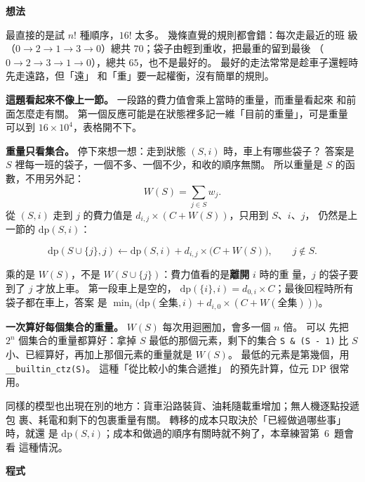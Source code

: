 \textbf{想法}

最直接的是試 $n!$ 種順序，$16!$ 太多。 幾條直覺的規則都會錯：每次走最近的班
級（$0 \to 2 \to 1 \to 3 \to 0$）總共 $70$；袋子由輕到重收，把最重的留到最後
（$0 \to 2 \to 3 \to 1 \to 0$），總共 $65$，也不是最好的。 最好的走法常常是趁車子還輕時先走遠路，但「遠」
和「重」要一起權衡，沒有簡單的規則。

\textbf{這題看起來不像上一節。} 一段路的費力值會乘上當時的重量，而重量看起來
和前面怎麼走有關。 第一個反應可能是在狀態裡多記一維「目前的重量」，可是重量
可以到 $16 \times 10^4$，表格開不下。

\textbf{重量只看集合。} 停下來想一想：走到狀態 $(S, i)$ 時，車上有哪些袋子？
答案是 $S$ 裡每一班的袋子，一個不多、一個不少，和收的順序無關。 所以重量是
$S$ 的函數，不用另外記：
\[
W(S) = \sum_{j \in S} w_j .
\]
從 $(S, i)$ 走到 $j$ 的費力值是 $d_{i,j} \times (C + W(S))$，只用到 $S$、$i$、$j$，
仍然是上一節的 $\mathrm{dp}(S, i)$：

\begin{center}
\end{center}

\[
\mathrm{dp}(S \cup \{j\}, j) \leftarrow \mathrm{dp}(S, i) + d_{i,j} \times \bigl(C + W(S)\bigr), \qquad j \notin S.
\]

乘的是 $W(S)$，不是 $W(S \cup \{j\})$：費力值看的是\textbf{離開} $i$ 時的重
量，$j$ 的袋子要到了 $j$ 才放上車。 第一段車上是空的，
$\mathrm{dp}(\{i\}, i) = d_{0,i} \times C$；最後回程時所有袋子都在車上，答案
是 $\min_i \bigl(\mathrm{dp}(\text{全集}, i) + d_{i,0} \times (C + W(\text{全集}))\bigr)$。

\textbf{一次算好每個集合的重量。} $W(S)$ 每次用迴圈加，會多一個 $n$ 倍。 可以
先把 $2^n$ 個集合的重量都算好：拿掉 $S$ 最低的那個元素，剩下的集合
\texttt{S \& (S - 1)} 比 $S$ 小、已經算好，再加上那個元素的重量就是 $W(S)$。
最低的元素是第幾個，用 \texttt{\_\_builtin\_ctz(S)}。 這種「從比較小的集合遞推」
的預先計算，位元 DP 很常用。

同樣的模型也出現在別的地方：貨車沿路裝貨、油耗隨載重增加；無人機逐點投遞包
裹、耗電和剩下的包裹重量有關。 轉移的成本只取決於「已經做過哪些事」時，就還
是 $\mathrm{dp}(S, i)$；成本和做過的順序有關時就不夠了，本章練習第~6~題會看
這種情況。

\textbf{程式}

